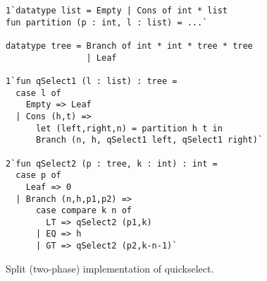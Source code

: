 \begin{figure}
\begin{lstlisting}
1`datatype list = Empty | Cons of int * list
fun partition (p : int, l : list) = ...`
	
datatype tree = Branch of int * int * tree * tree
                | Leaf

1`fun qSelect1 (l : list) : tree =
  case l of
    Empty => Leaf
  | Cons (h,t) => 
      let (left,right,n) = partition h t in
      Branch (n, h, qSelect1 left, qSelect1 right)`

2`fun qSelect2 (p : tree, k : int) : int = 
  case p of
    Leaf => 0
  | Branch (n,h,p1,p2) => 
      case compare k n of
        LT => qSelect2 (p1,k)
      | EQ => h
      | GT => qSelect2 (p2,k-n-1)`
\end{lstlisting}
\caption{Split (two-phase) implementation of quickselect.}
\label{fig:qs-split}
\end{figure}

